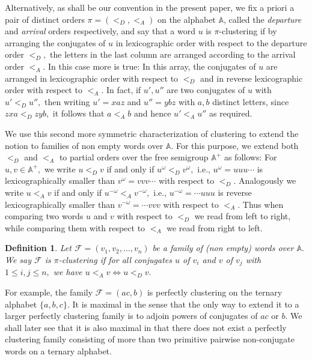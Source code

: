 \documentclass[12pt,a4paper]{amsart}
\newcommand{\A}{{\mathbb A}}
\newtheorem{definition}{Definition}
\begin{document}
Alternatively, as shall be our convention in the present paper, we  fix a priori a  pair of distinct orders $\pi= (<_D, <_A)$ on the alphabet $\A $, called the {\it departure} and  {\it arrival} orders respectively, and  say that a word $u$ is $\pi$-clustering if by arranging the conjugates of $u$ in lexicographic order with respect to the departure order $<_D,$ the letters in the last column are arranged according to the arrival order $<_A.$ 
In this case more is true: In this array, the conjugates of $u$ are arranged in  lexicographic order with respect to $<_D$ and in reverse lexicographic order with respect to $<_A.$ In fact, if $u',u''$ are two conjugates of $u$ with $u'<_D u'',$ then writing $u'=xaz$ and $u''=ybz$ with $a,b$  distinct letters, since $zxa<_D zyb,$ it follows that $a<_A b$ and hence $u'<_A u''$ as required. 


We use this second more symmetric characterization of clustering to extend the notion to families of non empty words over $\A.$ For this purpose, we extend both $<_D$ and $<_A$ to partial orders over the free semigroup $\A^+$ as follows: For $u,v \in \A^+,$ we write $u<_D v$ if and only if $u^\omega<_D v^\omega,$ i.e., $u^\omega=uuu\cdots$  is lexicographically smaller than $v^\omega=vvv\cdots$ with respect to $<_D.$ Analogously we write $u<_A v$ if and only if $u^{-\omega}<_A v^{-\omega},$ i.e., $u^{-\omega}=\cdots uuu$  is reverse lexicographically smaller than $v^{-\omega}=\cdots vvv$ with respect to $<_A.$ Thus when comparing two words $u$ and $v$ with respect to $<_D$ we read from left to right, while comparing them with respect to $<_A$ we read from right to left.   


 
\begin{definition}Let $\mathcal F=(v_1,v_2,\ldots ,v_n)$ be a family of  (non empty) words over $\A.$ We say $\mathcal F$ is $\pi$-clustering if for all conjugates $u$ of $v_i$ and $v$ of $v_j$ with $1\leq i,j\leq n,$ we have $u<_A v\Leftrightarrow u<_D v.$
 \end{definition}
 
 For example, the family $\mathcal F=(ac,b)$ is perfectly clustering on the ternary alphabet $\{a,b,c\}.$  It is maximal in the sense that the only way to extend it to a larger perfectly clustering family is to adjoin powers of conjugates of $ac$ or $b.$ We shall later see that it is also maximal in that there does not exist a perfectly clustering family consisting of more than two primitive pairwise non-conjugate words on a ternary alphabet. 
 
\end{document}
